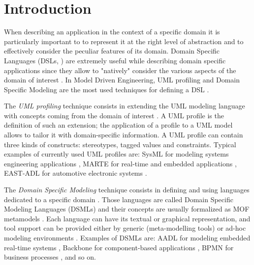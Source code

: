 \section{Introduction}\label{sec:intro}

When describing an application in the context of a specific domain it is particularly important to 
to represent it at the right level of abstraction and to effectively consider the peculiar features of its domain.
Domain Specific Languages (DSLs, \cite{cite}) are extremely useful while describing domain specific applications since they allow to "natively" consider the various aspects of the domain of interest \cite{cite}. 
In Model Driven Engineering, UML profiling and Domain Specific Modeling are the most used techniques for defining a DSL \cite{cite}. 

The \textit{UML profiling} technique consists in extending the UML modeling language with concepts coming from the domain of interest \cite{cite}.
A UML profile is the definition of such an extension; the application of a profile to a UML model allows to tailor it with domain-specific information. A UML profile can contain three kinds of constructs: stereotypes, tagged values and constraints.
Typical examples of currently used UML profiles are: SysML for modeling systems engineering applications \cite{cite}, 
MARTE for real-time and embedded applications \cite{cite}, EAST-ADL for automotive electronic systems \cite{cite}.

The \textit{Domain Specific Modeling} technique consists in defining and using languages dedicated to a specific domain \cite{cite}.
Those languages are called Domain Specific Modeling Languages (DSMLs) and their concepts are usually formalized as MOF metamodels \cite{cite}.
Each language can have its textual or graphical representation, and tool support can be provided either by generic (meta-modelling tools) or
ad-hoc modeling environments \cite{cite}. 
Examples of DSMLs are: AADL for modeling embedded real-time systems \cite{cite}, Backbone for component-based applications \cite{cite}, BPMN for business processes \cite{cite}, and so on. 
 
